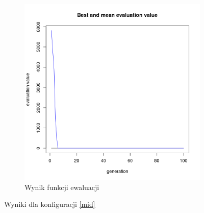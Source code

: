 \documentclass{llncs}
\begin{document}
\begin{figure}[H]
\begin{subfigure}[b]{0.5\textwidth}
                \includegraphics[width=\textwidth]{img/plot}
                \caption{Wynik funkcji ewaluacji}
                \label{fig:tiger}
        \end{subfigure}
        \caption{Wyniki dla konfiguracji \ref{mid}}
        \label{fig:small}
\end{figure}
\end{document}
